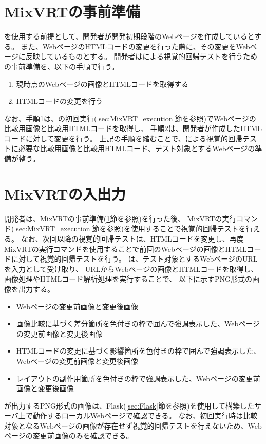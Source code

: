 \section{MixVRTの事前準備}\label{sec:MixVRT_preparation}
\toolName を使用する前提として、開発者が開発初期段階のWebページを作成しているとする。
また、WebページのHTMLコードの変更を行った際に、その変更をWebページに反映しているものとする。
開発者は\toolName による視覚的回帰テストを行うための事前準備を、以下の手順で行う。
\begin{enumerate}
    \item 現時点のWebページの画像とHTMLコードを取得する
    \item HTMLコードの変更を行う
\end{enumerate}
なお、手順1は、\toolName の初回実行(\ref{sec:MixVRT_execution}節を参照)でWebページの比較用画像と比較用HTMLコードを取得し、
手順2は、開発者が作成したHTMLコードに対して変更を行う。
上記の手順を踏むことで、\toolName による視覚的回帰テストに必要な比較用画像と比較用HTMLコード、テスト対象とするWebページの準備が整う。
\par

\section{MixVRTの入出力}\label{sec:MixVRT_IO}
開発者は、MixVRTの事前準備(\ref{sec:MixVRT_preparation}節を参照)を行った後、
MixVRTの実行コマンド(\ref{sec:MixVRT_execution}節を参照)を使用することで視覚的回帰テストを行える。
なお、次回以降の視覚的回帰テストは、HTMLコードを変更し、再度MixVRTの実行コマンドを使用することで前回のWebページの画像とHTMLコードに対して視覚的回帰テストを行う。
\toolName は、テスト対象とするWebページのURLを入力として受け取り、
URLからWebページの画像とHTMLコードを取得し、
画像処理やHTMLコード解析処理を実行することで、
以下に示すPNG形式の画像を出力する。
\begin{itemize}
    \item Webページの変更前画像と変更後画像
    \item 画像比較に基づく差分箇所を色付きの枠で囲んで強調表示した、Webページの変更前画像と変更後画像
    \item HTMLコードの変更に基づく影響箇所を色付きの枠で囲んで強調表示した、Webページの変更前画像と変更後画像
    \item レイアウトの副作用箇所を色付きの枠で強調表示した、Webページの変更前画像と変更後画像
\end{itemize}
\toolName が出力するPNG形式の画像は、Flask(\ref{sec:Flask}節を参照)を使用して構築したサーバ上で動作するローカルWebページで確認できる。
なお、\toolName 初回実行時は比較対象となるWebページの画像が存在せず視覚的回帰テストを行えないため、Webページの変更前画像のみを確認できる。
\par

